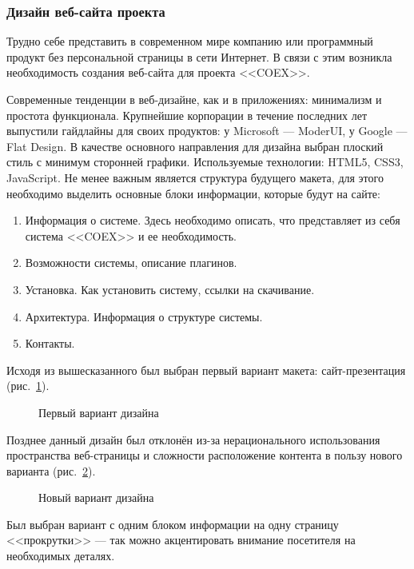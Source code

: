 \subsubsection{ Дизайн веб-сайта проекта }

Трудно себе представить в современном мире компанию или программный продукт без персональной страницы в сети Интернет. В связи с этим возникла необходимость создания веб-сайта для проекта <<COEX>>.

Современные тенденции в веб-дизайне, как и в приложениях: минимализм и простота функционала. Крупнейшие корпорации в течение последних лет выпустили гайдлайны для своих продуктов: у Microsoft --- ModerUI, у Google --- Flat Design.
В качестве основного направления для дизайна выбран плоский стиль с минимум сторонней графики. Используемые технологии: HTML5, CSS3, JavaScript.
Не менее важным является структура будущего макета, для этого необходимо выделить основные блоки информации, которые будут на сайте:
\begin{enumerate}
  \item Информация о системе. Здесь необходимо описать, что представляет из себя система <<COEX>> и ее необходимость.
  \item Возможности системы, описание плагинов.
  \item Установка. Как установить систему, ссылки на скачивание.
  \item Архитектура. Информация о структуре системы.
  \item Контакты.
\end{enumerate}

Исходя из вышесказанного был выбран первый вариант макета: сайт-презентация (рис.~\ref{lo1:lo1}).

\begin{figure}[h!]
\center{\texttt{[image: lo1]}}
\caption{ Первый вариант дизайна }
\label{lo1:lo1}
\end{figure}

Позднее данный дизайн был отклонён из-за нерационального использования пространства веб-страницы и сложности расположение контента в пользу нового варианта (рис.~\ref{lo2:lo2}).

\begin{figure}[h!]
\center{\texttt{[image: lo2]}}
\caption{ Новый вариант дизайна }
\label{lo2:lo2}
\end{figure}

Был выбран вариант с одним блоком информации на одну страницу <<прокрутки>> --- так можно акцентировать внимание посетителя на необходимых деталях.

